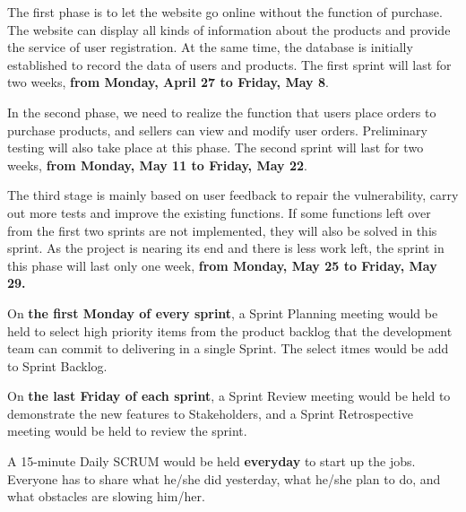 \documentclass{report}
\begin{document}
The first phase is to let the website go online without the function of purchase. The website can display all kinds of information about the products and provide the service of user registration. At the same time, the database is initially established to record the data of users and products. The first sprint will last for two weeks, \textbf{from Monday, April 27 to Friday, May 8}. 


In the second phase, we need to realize the function that users place orders to purchase products, and sellers can view and modify user orders. Preliminary testing will also take place at this phase. The second sprint will last for two weeks, \textbf{from Monday, May 11 to Friday, May 22}.

The third stage is mainly based on user feedback to repair the vulnerability, carry out more tests and improve the existing functions. If some functions left over from the first two sprints are not implemented, they will also be solved in this sprint. As the project is nearing its end and there is less work left, the sprint in this phase will last only one week, \textbf{from Monday, May 25 to Friday, May 29.}

On \textbf{the first Monday of every sprint}, a Sprint Planning meeting would be held to select high priority items from the product backlog that the development team can commit to delivering in a single Sprint. The select itmes would be add to Sprint Backlog.

On \textbf{the last Friday of each sprint}, a Sprint Review meeting would be held to demonstrate the new features to Stakeholders, and a Sprint Retrospective meeting would be held to review the sprint.

A 15-minute Daily SCRUM would be held \textbf{everyday} to start up the jobs. Everyone has to share what he/she did yesterday, what he/she plan to do, and what obstacles are slowing him/her.
\end{document}
